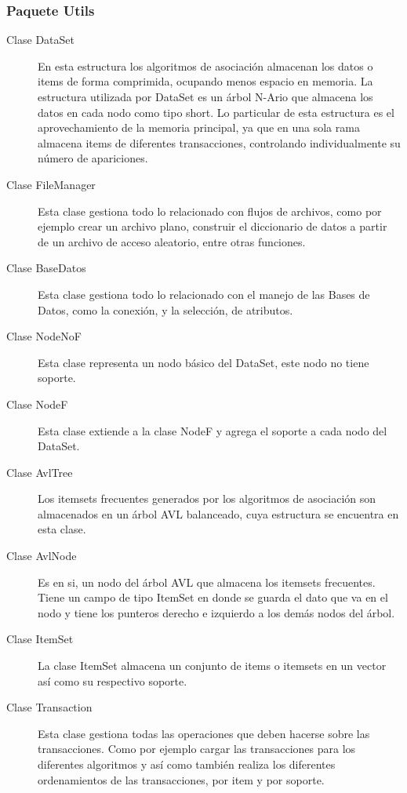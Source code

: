 \subsubsection{Paquete Utils}
\begin{description}
\item [Clase DataSet] En esta estructura los algoritmos de asociaci\'on almacenan los datos o items de 
forma comprimida, ocupando menos espacio en memoria. La estructura utilizada por DataSet es un \'arbol
N-Ario que almacena los datos en cada nodo como tipo short. Lo particular de esta estructura es el 
aprovechamiento de la memoria principal, ya que en una sola rama almacena items de diferentes 
transacciones, controlando individualmente su n\'umero de apariciones.
\item [Clase FileManager] Esta clase gestiona todo lo relacionado con flujos de archivos, como por 
ejemplo crear un archivo plano, construir el diccionario de datos a partir de un archivo de acceso
aleatorio, entre otras funciones.
\item [Clase BaseDatos] Esta clase gestiona todo lo relacionado con el manejo de las Bases de Datos, 
como la conexi\'on, y la selecci\'on, de atributos.
\end{description}

\begin{description}
\item [Clase NodeNoF] Esta clase representa un nodo b\'asico del DataSet, este nodo no tiene soporte.
\item [Clase NodeF] Esta clase extiende a la clase NodeF y agrega el soporte a cada nodo del DataSet.
\item [Clase AvlTree] Los itemsets frecuentes generados por los algoritmos de asociaci\'on son
almacenados en un \'arbol AVL balanceado, cuya estructura se encuentra en esta clase.
\item [Clase AvlNode] Es en si, un nodo del \'arbol AVL que almacena los itemsets frecuentes. Tiene un
campo de tipo ItemSet en donde se guarda el dato que va en el nodo y tiene los punteros derecho e 
izquierdo a los dem\'as nodos del \'arbol.
\item [Clase ItemSet] La clase ItemSet almacena un conjunto de items o itemsets en un vector as\'i como
su respectivo soporte.
\item [Clase Transaction] Esta clase gestiona todas las operaciones que deben hacerse sobre las
transacciones. Como por ejemplo cargar las transacciones para los diferentes algoritmos y as\'i como 
tambi\'en realiza los diferentes ordenamientos de las transacciones, por item y por soporte.
\end{description}

